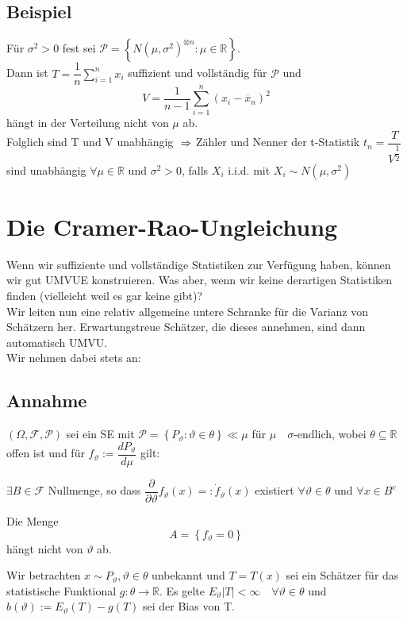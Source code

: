 \documentclass[german,10pt,oneside, fleqn, a4paper]{article}
\newcommand {\R}	{\mathbb{R}}
\newcommand{\Ra}	{\Rightarrow}
\newcommand{\ra}{\rightarrow}
\newcommand{\sm}[2][\infty]{\sum\limits_{#2}^{#1}}
\newcommand{\brc}[1]{\left(#1\right)}
\newcommand{\brac}[1]{\left\lbrace #1\right\rbrace}
\newcommand{\mc}[1]{\mathcal{#1}}
\newcommand{\1}[1]{1_{#1}}
\newcommand{\2}[1]{\1{\brac{#1}}}
\newcommand{\rraum}{\brc{\Omega,\mc{F},\mc{P}}}
\newcommand{\f}{\mc{F}}
\newcommand{\p}{\mc{P}}
\newcommand{\sumi}{\sm[n]{i=1}}
\newcommand{\qf}{\quad\forall}
\newcommand{\stuff}{{\otimes n}}
\begin{document}
\subsection{Beispiel}
\label{12.9}
Für $\sigma^2>0$ fest sei $\p=\brac{N(\mu,\sigma^2)^\stuff:\mu\in\R}$.\\
Dann ist $T=\dfrac{1}{n}\sumi x_i$ suffizient und vollständig für $\p$ und \[
V=\dfrac{1}{n-1}\sumi (x_i-\overline{x}_n)^2\]
hängt in der Verteilung nicht von $\mu$ ab.\\
Folglich sind T und V unabhängig
$\\\Ra$ Zähler und Nenner der t-Statistik $t_n=\dfrac{T}{V^{\dfrac{1}{2}}}$ sind unabhängig $\forall \mu\in\R$ und $\sigma^2>0$, falls $X_i$ i.i.d. mit $X_i\sim N(\mu,\sigma^2)$



\pagebreak
\section{Die Cramer-Rao-Ungleichung}
Wenn wir suffiziente und vollständige Statistiken zur Verfügung haben, können wir gut UMVUE konstruieren. Was aber, wenn wir keine derartigen Statistiken finden  (vielleicht weil es gar keine gibt)?\\
Wir leiten nun eine relativ allgemeine untere Schranke für die Varianz von Schätzern her. Erwartungstreue Schätzer, die dieses annehmen, sind dann automatisch UMVU.\\
Wir nehmen dabei stets an:

\subsection{Annahme}
\label{13.1}
$\rraum$ sei ein SE mit $\p=\brac{P_\vartheta:\vartheta\in\theta}\ll\mu$ für $\mu\quad \sigma$-endlich, wobei $\theta\subseteq\R$ offen ist und für $f_\vartheta:=\dfrac{dP_\vartheta}{d\mu}$ gilt:\begin{list}{•}{}
\item $\exists B\in\f$ Nullmenge, so dass $\dfrac{\partial}{\partial\vartheta}f_\vartheta(x)=:\dot f_\vartheta(x)$ existiert $\forall\vartheta\in\theta$ und $\forall x\in B^c$
\item Die Menge \[A=\brac{f_\vartheta=0}\]
hängt nicht von $\vartheta$ ab.
\end{list}
Wir betrachten $x\sim P_\vartheta, \vartheta\in\theta$ unbekannt und $T=T(x)$ sei ein Schätzer für das statistische Funktional $g:\theta\ra\R$. Es gelte $E_\vartheta|T|<\infty\qf\vartheta\in\theta$ und $b(\vartheta):=E_\vartheta(T)-g(T)$ sei der Bias von T.
\end{document}
